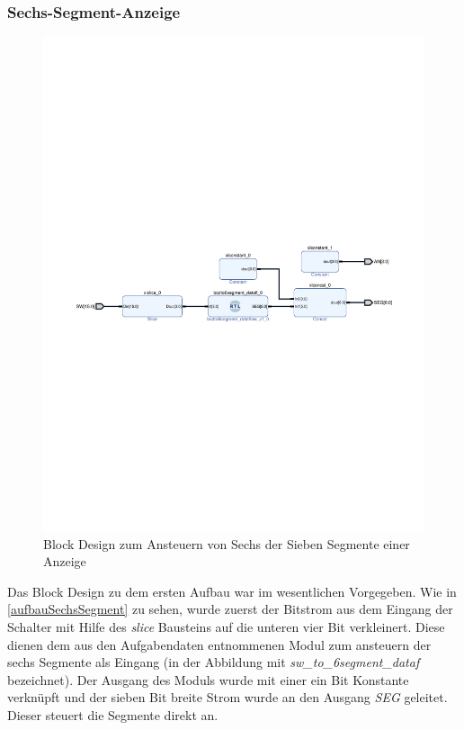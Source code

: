 \documentclass[11pt, a4paper]{article}
\begin{document}
\subsubsection*{Sechs-Segment-Anzeige}
\begin{figure}[htb]    
    \centering
    \includegraphics[width=\linewidth]{versuch1Data/seven_segment_display1.pdf}
    \caption{Block Design zum Ansteuern von Sechs der Sieben Segmente einer Anzeige}
    \label{aufbauSechsSegment}        
\end{figure}
Das Block Design zu dem ersten Aufbau war im wesentlichen Vorgegeben. Wie in \autoref{aufbauSechsSegment} zu sehen, wurde zuerst der Bitstrom aus dem Eingang der Schalter mit Hilfe des \textit{slice} Bausteins auf die unteren vier Bit verkleinert. Diese dienen dem aus den Aufgabendaten entnommenen Modul zum ansteuern der sechs Segmente als Eingang (in der Abbildung mit \textit{sw_to_6segment_dataf} bezeichnet). Der Ausgang des Moduls wurde mit einer ein Bit Konstante verknüpft und der sieben Bit breite Strom wurde an den Ausgang \textit{SEG} geleitet. Dieser steuert die Segmente direkt an.
\end{document}
